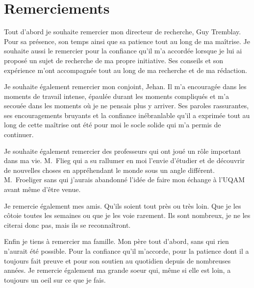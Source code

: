 \chapter*{Remerciements}


Tout d'abord je souhaite remercier mon directeur de recherche, Guy Tremblay.
Pour sa présence, son temps ainsi que sa patience tout au long de ma maîtrise.
Je souhaite aussi le remercier pour la confiance qu'il m'a accordée lorsque je lui ai proposé un sujet de recherche de ma propre initiative.
Ses conseils et son expérience m'ont accompagnée tout au long de ma recherche et de ma rédaction.


Je souhaite également remercier mon conjoint, Jehan.
Il m'a encouragée dans les moments de travail intense, épaulée durant les moments compliqués et m'a secouée dans les moments où je ne pensais plus y arriver. 
Ses paroles rassurantes, ses encouragements bruyants et la confiance inébranlable qu'il a exprimée tout au long de cette maîtrise ont été pour moi le socle solide qui m'a permis de continuer.


Je souhaite également remercier des professeurs qui ont joué un rôle important dans ma vie.
M.~Flieg qui a su rallumer en moi l'envie d'étudier et de découvrir de nouvelles choses en appréhendant le monde sous un angle différent.
M.~Froeliger sans qui j'aurais abandonné l'idée de faire mon échange à l'UQAM avant même d'être venue.


Je remercie également mes amis.
Qu'ils soient tout près ou très loin.
Que je les côtoie toutes les semaines ou que je les voie rarement.
Ils sont nombreux, je ne les citerai donc pas, mais ils se reconnaîtront.


Enfin je tiens à remercier ma famille.
Mon père tout d'abord, sans qui rien n'aurait été possible.
Pour la confiance qu'il m'accorde, pour la patience dont il a toujours fait preuve et pour son soutien au quotidien depuis de nombreuses années.
Je remercie également ma grande soeur qui, même si elle est loin, a toujours un oeil sur ce que je fais.
